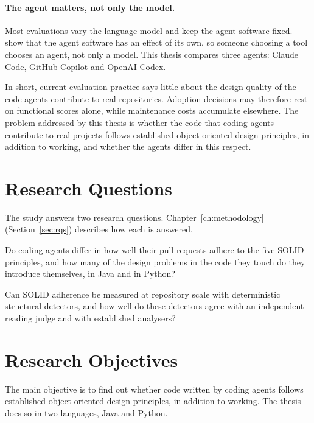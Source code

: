 \paragraph{The agent matters, not only the model.} Most evaluations vary the language model and
keep the agent software fixed. \citet{bensghaier2026harness} show that the agent software has an
effect of its own, so someone choosing a tool chooses an agent, not only a model. This thesis
compares three agents: Claude Code, GitHub Copilot and OpenAI Codex.

In short, current evaluation practice says little about the design quality of the code agents
contribute to real repositories. Adoption decisions may therefore rest on functional scores alone,
while maintenance costs accumulate elsewhere. The problem addressed by this thesis is whether the
code that coding agents contribute to real projects follows established object-oriented design
principles, in addition to working, and whether the agents differ in this respect.

\section{Research Questions}
\label{sec:research-questions}

The study answers two research questions. Chapter~\ref{ch:methodology}
(Section~\ref{sec:rqs}) describes how each is answered.

\begin{description}[leftmargin=2.4cm,style=nextline]
  \item[RQ1 (Adherence and differentiation)] Do coding agents differ in how well their pull requests
  adhere to the five SOLID principles, and how many of the design problems in the code they touch do
  they introduce themselves, in Java and in Python?

  \item[RQ2 (Measurability)] Can SOLID adherence be measured at repository scale with deterministic
  structural detectors, and how well do these detectors agree with an independent reading judge and
  with established analysers?
\end{description}

\section{Research Objectives}
\label{sec:research-objectives}

The main objective is to find out whether code written by coding agents follows established
object-oriented design principles, in addition to working. The thesis does so in two languages, Java
and Python.

